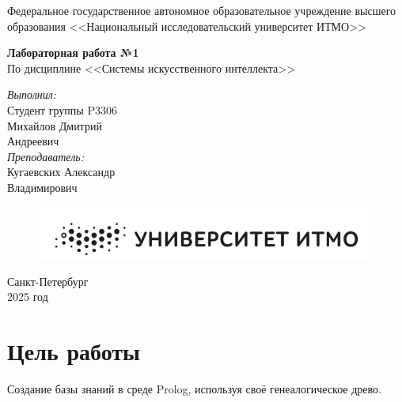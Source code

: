 \documentclass[12pt]{report}
\begin{document}
	
	\begin{titlepage}
		\begin{center}
			\large{Федеральное государственное автономное образовательное учреждение высшего образования <<Национальный исследовательский университет ИТМО>>}
		\end{center}
		
		\vspace{15em}
		
		\begin{center}
			\huge{\textbf{Лабораторная работа №1}} \\
			\large{По дисциплине <<Системы искусственного интеллекта>>} \\
		\end{center}
		
		\vspace{5em}
		
		\begin{flushright}
			\textit{\large{Выполнил:}} \\
			\large{Студент группы P3306} \\
			\large{Михайлов Дмитрий} \\
			\large{Андреевич} \\
			\textit{\large{Преподаватель:}} \\
			\large{Кугаевских Александр} \\
			\large{Владимирович}
		\end{flushright}
		
		\vspace{2cm}
		
		\begin{figure}[h]
			\centering
			\includegraphics[width=0.5\linewidth]{image.png}
		\end{figure}
		
		\begin{center}
			Санкт-Петербург \\
			2025 год
		\end{center}
	\end{titlepage}
	
	\tableofcontents
	\newpage
	
	\section*{Цель работы}
	Создание базы знаний в среде Prolog, используя своё генеалогическое древо.
	
\end{document}
